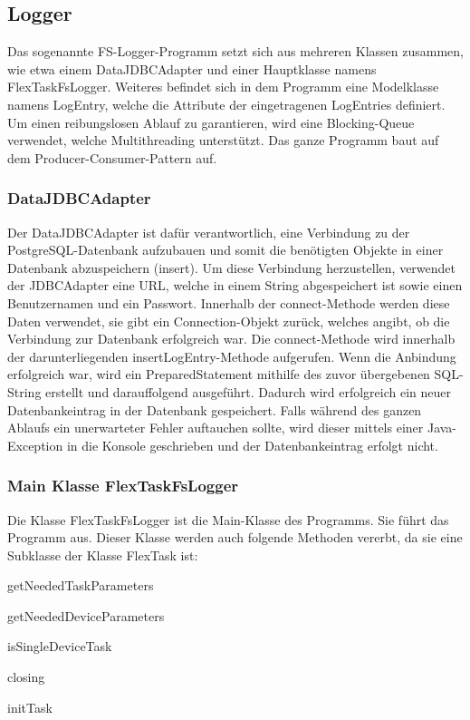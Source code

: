 \subsection{Logger}
Das sogenannte FS-Logger-Programm setzt sich aus mehreren Klassen zusammen, wie etwa einem DataJDBCAdapter und einer Hauptklasse namens FlexTaskFsLogger. Weiteres befindet sich in dem Programm eine Modelklasse namens LogEntry, welche die Attribute der eingetragenen LogEntries definiert. Um einen reibungslosen Ablauf zu garantieren, wird eine Blocking-Queue verwendet, welche Multithreading unterstützt. Das ganze Programm baut auf dem Producer-Consumer-Pattern auf.          
 
\subsubsection{DataJDBCAdapter}
Der DataJDBCAdapter ist dafür verantwortlich, eine Verbindung zu der PostgreSQL-Datenbank aufzubauen und somit die benötigten Objekte in einer Datenbank abzuspeichern (insert). Um diese Verbindung herzustellen, verwendet der JDBCAdapter eine URL, welche in einem String abgespeichert ist sowie einen Benutzernamen und ein Passwort. Innerhalb der connect-Methode werden diese Daten verwendet, sie gibt ein Connection-Objekt zurück, welches angibt, ob die Verbindung zur Datenbank erfolgreich war. Die connect-Methode wird innerhalb der darunterliegenden insertLogEntry-Methode aufgerufen. Wenn die Anbindung erfolgreich war, wird ein PreparedStatement mithilfe des zuvor übergebenen SQL-String erstellt und darauffolgend ausgeführt. Dadurch wird erfolgreich ein neuer Datenbankeintrag in der Datenbank gespeichert. Falls während des ganzen Ablaufs ein unerwarteter Fehler auftauchen sollte, wird dieser mittels einer Java-Exception in die Konsole geschrieben und der Datenbankeintrag erfolgt nicht.
 
\subsubsection{Main Klasse FlexTaskFsLogger}
Die Klasse FlexTaskFsLogger ist die Main-Klasse des Programms. Sie führt das Programm aus. Dieser Klasse werden auch folgende Methoden vererbt, da sie eine Subklasse der Klasse FlexTask ist:
\begin{compactitem}
    \item getNeededTaskParameters
    \item getNeededDeviceParameters
    \item isSingleDeviceTask
    \item closing
    \item initTask
\end{compactitem}
 
